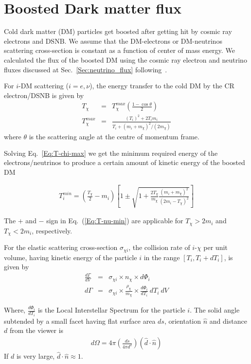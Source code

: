\documentclass[11pt,prd,twocolumn,nofootinbib,reprint,superscriptaddress,longbibliography,colorlinks=true,citecolor=blue]{revtex4-1}
\def\bea{\begin{eqnarray}}
\def\eea{\end{eqnarray}}
\begin{document}

\section{Boosted Dark matter flux}
\label{Sec:bdm_flux}

 Cold dark matter (DM) particles get boosted after getting hit by cosmic ray electrons and DSNB. { We assume that the DM-electrons or DM-neutrinos scattering cross-section is constant as a function of center of mass energy.} We calculated the flux of the boosted DM using the cosmic ray electron and neutrino fluxes discussed at Sec.~\ref{Sec:neutrino_flux} following~\cite{Bringmann:2018cvk,Ema:2018bih,Cappiello:2018hsu}.
 
For $i$-DM scattering ($i=e,\nu$), the energy transfer to the cold DM by the CR electron/DSNB is given by
    \bea
  T_{\chi} &=&  T_{\chi}^{max}  \left( \frac{ 1 - \cos \theta }{2}\right)\nonumber \\ T_{\chi}^{max} &=& \frac{\left(T_i\right)^2+ 2 T_i m_i  }{T_i+ \left(m_i +m_{\chi} \right)^2/\left(2 m_{\chi} \right)} 
  \label{Eq:T-chi-max} 
  \eea
 where $\theta$ is the scattering angle at the centre of momentum frame.
 
 Solving Eq.~\ref{Eq:T-chi-max} we get the minimum required energy of the electrons/neutrinos to produce a certain amount of kinetic energy of the boosted DM
  
  \bea
  T_i^{min} = \left( \frac{T_{\chi}}{2} -m_i \right) \left[ 1 \pm \sqrt{ 1 +  \frac{2 T_{\chi}}{ m_{\chi}} \frac{\left(m_i +m_{\chi}\right)^2}{\left( 2m_i - T_{\chi} \right)^2}} \right] 
  \label{Eq:T-nu-min}
  \eea
  
  The $+$ and $-$ sign in Eq.~(\ref{Eq:T-nu-min}) are applicable for $T_\chi > 2 m_i$ and $T_\chi < 2 m_i$, respectively. 
  
  For the elastic scattering cross-section $\sigma_{\chi i}$, the collision rate of $i$-$\chi$ per unit volume, having kinetic energy of the particle $i$ in the range $\left[ T_i, T_i + dT_i \right]$, is given by
 \bea
 \frac{d\Gamma}{dV} &=& \sigma_{\chi i} \times n_{\chi} \times d\Phi_i \nonumber \\
 d\Gamma &=& \sigma_{\chi i} \times \frac{\rho_\chi}{m_\chi} \times \frac{d\Phi_i}{dT_i}~dT_i~dV
 \eea
 
  Where, $\frac{d\Phi_i}{dT_i}$ is the Local Interstellar Spectrum for the particle $i$. The solid angle subtended by a small facet having flat surface area $ds$, orientation $\hat{n}$ and distance $d$ from the viewer is
 \bea
 d\Omega = 4\pi \left( \frac{ds}{4\pi d^2}\right) \left(\hat{d}\cdot \hat{n} \right)
 \eea 
 If $d$ is very large, $\hat{d} \cdot \hat{n} \approx 1$.
 
\end{document}
